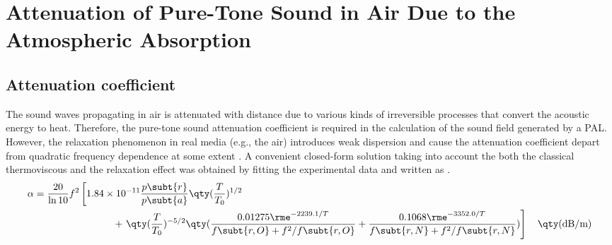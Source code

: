 \chapter{Attenuation of Pure-Tone Sound in Air Due to the Atmospheric Absorption} %

\label{append:absorption} %

\section{Attenuation coefficient}
The sound waves propagating in air is attenuated with distance due to various kinds of irreversible processes that convert the acoustic energy to heat.
Therefore, the pure-tone sound attenuation coefficient is required in the calculation of the sound field generated by a PAL.
However, the relaxation phenomenon in real media (e.g., the air) introduces weak dispersion and cause the attenuation coefficient depart from quadratic frequency dependence at some extent \cite{Hamilton2016EffectiveGolDberg}. 
A convenient closed-form solution taking into account the both the classical thermoviscous and the relaxation effect was obtained by fitting the experimental data and written as \cite{1993ISO961311993, Bass1990AtmosphericAbsorptionSound, Bass1995AtmosphericAbsorptionSound, Bass1996ErratumAtmosphericAbsorption}.
\begin{equation}
    \begin{split}
    \alpha 
    &= \frac{20}{\ln 10}f^2 \left[1.84\times 10^{-11}\frac{p\subt{r} }{p\subt{a}} \qty(\frac{T}{T_0})^{1/2}\right.\\
    &\qquad \qquad \qquad\qquad+\left.\qty(\frac{T}{T_0})^{-5/2}
    \qty(\frac{0.01275\rme^{-2239.1/T}}{f\subt{r,O} + f^2/f\subt{r,O}} + \frac{0.1068\rme^{-3352.0/T}}{f\subt{r,N} + f^2 /f\subt{r,N}})\right]
    \quad 
    \qty(\text{dB/m})
    \label{eq:230fs2}
    \end{split}
\end{equation}
